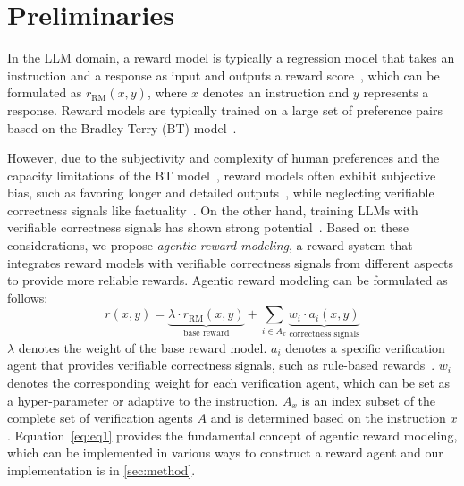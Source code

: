 \section{Preliminaries}
In the LLM domain, a reward model is typically a regression model that takes an instruction and a response as input and outputs a reward score~\citep{ouyang2022training}, which can be formulated as $r_{\text{RM}}(x,y)$, where $x$ denotes an instruction and $y$ represents a response. Reward models are typically trained on a large set of preference pairs based on the Bradley-Terry (BT) model~\citep{bradley1952rank}.


However, due to the subjectivity and complexity of human preferences and the capacity limitations of the BT model~\citep{munos2023nash, swamy2024minimaximalist, sun2024rethinking}, reward models often exhibit subjective bias, such as favoring longer and detailed outputs~\citep{saito2023verbosity}, while neglecting verifiable correctness signals like factuality~\citep{liu2024rm, tan2024judgebench}. On the other hand, training LLMs with verifiable correctness signals has shown strong potential~\citep{lambert2024t, guo2025deepseek}. Based on these considerations, we propose \textit{agentic reward modeling}, a reward system that integrates reward models with verifiable correctness signals from different aspects to provide more reliable rewards. Agentic reward modeling can be formulated as follows:
\begin{equation}
r(x, y) = \underbrace{\lambda \cdot r_{\text{RM}}(x, y)}_{\text{base reward}} + \sum_{i \in A_x} \underbrace{w_i \cdot a_i(x, y)}_{\text{correctness signals}}
\label{eq:eq1}
\end{equation}
$\lambda$ denotes the weight of the base reward model. $a_i$ denotes a specific verification agent that provides verifiable correctness signals, such as rule-based rewards~\citep{mu2024rule}. $w_i$ denotes the corresponding weight for each verification agent, which can be set as a hyper-parameter or adaptive to the instruction. $A_x$ is an index subset of the complete set of verification agents $A$ and is determined based on the instruction $x$. Equation~\ref{eq:eq1} provides the fundamental concept of agentic reward modeling, which can be implemented in various ways to construct a reward agent and our implementation is in \cref{sec:method}.
